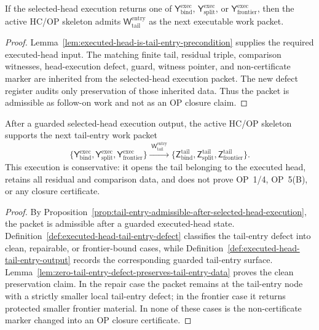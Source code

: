 \begin{proposition}
\label{prop:tail-entry-admissible-after-selected-head-execution}
If the selected-head execution returns one of \(\mathsf Y_{\mathrm{bind}}^{\mathrm{exec}}\), \(\mathsf Y_{\mathrm{split}}^{\mathrm{exec}}\), or \(\mathsf Y_{\mathrm{frontier}}^{\mathrm{exec}}\), then the active HC/OP skeleton admits \(\mathsf W_{\mathrm{tail}}^{\mathrm{entry}}\) as the next executable work packet.
\end{proposition}

\begin{proof}
Lemma~\ref{lem:executed-head-is-tail-entry-precondition} supplies the required executed-head input.  The matching finite tail, residual triple, comparison witnesses, head-execution defect, guard, witness pointer, and non-certificate marker are inherited from the selected-head execution packet.  The new defect register audits only preservation of those inherited data.  Thus the packet is admissible as follow-on work and not as an OP closure claim.
\end{proof}

\begin{theorem}
\label{thm:first-executed-head-tail-entry-packet}
After a guarded selected-head execution output, the active HC/OP skeleton supports the next tail-entry work packet
\[
  \{\mathsf Y_{\mathrm{bind}}^{\mathrm{exec}},
    \mathsf Y_{\mathrm{split}}^{\mathrm{exec}},
    \mathsf Y_{\mathrm{frontier}}^{\mathrm{exec}}\}
  \xrightarrow{\;\mathsf W_{\mathrm{tail}}^{\mathrm{entry}}\;}
  \{\mathsf Z_{\mathrm{bind}}^{\mathrm{tail}},
    \mathsf Z_{\mathrm{split}}^{\mathrm{tail}},
    \mathsf Z_{\mathrm{frontier}}^{\mathrm{tail}}\}.
\]
This execution is conservative: it opens the tail belonging to the executed head, retains all residual and comparison data, and does not prove OP~1/4, OP~5(B), or any closure certificate.
\end{theorem}

\begin{proof}
By Proposition~\ref{prop:tail-entry-admissible-after-selected-head-execution}, the packet is admissible after a guarded executed-head state.  Definition~\ref{def:executed-head-tail-entry-defect} classifies the tail-entry defect into clean, repairable, or frontier-bound cases, while Definition~\ref{def:executed-head-tail-entry-output} records the corresponding guarded tail-entry surface.  Lemma~\ref{lem:zero-tail-entry-defect-preserves-tail-entry-data} proves the clean preservation claim.  In the repair case the packet remains at the tail-entry node with a strictly smaller local tail-entry defect; in the frontier case it returns protected smaller frontier material.  In none of these cases is the non-certificate marker changed into an OP closure certificate.
\end{proof}

